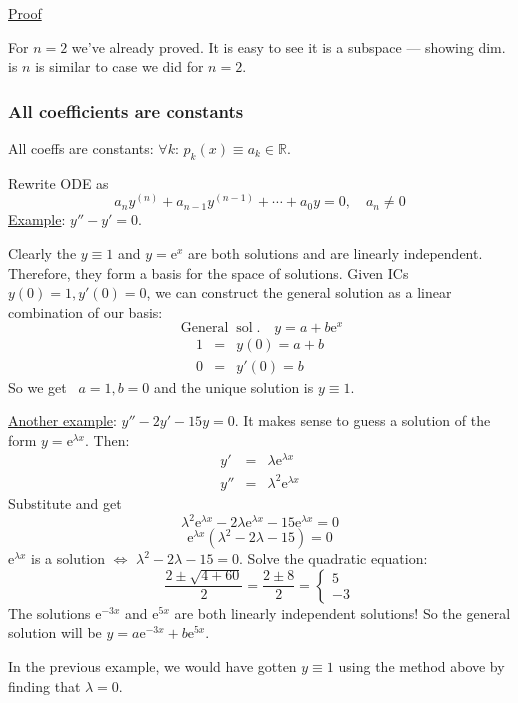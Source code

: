 \documentclass{article}
\newcommand{\mathe}{\mathrm{e}}
\newcommand{\nospace}{}
\newcommand{\nosymbol}{}
\newcommand{\tmop}[1]{\ensuremath{\operatorname{#1}}}
\begin{document}
{\underline{Proof}}

For $n = 2$ we've already proved. It is easy to see it is a subspace ---
showing dim. is $n$ is similar to case we did for $n = 2$.

\subsubsection{All coefficients are constants}

All coeffs are constants: $\forall k$: $p_k^{\nosymbol} (x) \equiv a_k \in
\mathbb{R}$.

Rewrite ODE as
\[ a_n y^{(n)} + a_{n - 1} y^{(n - 1)} + \cdots + a_0 y = 0, \quad a_n \neq 0
\]
{\underline{Example}}: $y'' - y' = 0$.

Clearly the $y \equiv 1$ and $y = \mathe^x$ are both solutions and are
linearly independent. Therefore, they form a basis for the space of solutions.
Given ICs $y (0) = 1, y' (0) = 0$, we can construct the general solution as a
linear combination of our basis:
\[ \tmop{General} \tmop{sol} . \nospace \quad y = a + b \mathe^x \]
\begin{eqnarray*}
  1 & = & y (0) = a + b\\
  0 & = & y' (0) = b
\end{eqnarray*}
So we get \ $a = 1, b = 0$ and the unique solution is $y \equiv 1$.

{\underline{Another example}}: $y'' - 2 y' - 15 y = 0$. It makes sense to
guess a solution of the form $y = \mathe^{\lambda x}$. Then:
\begin{eqnarray*}
  y' & = & \lambda \mathe^{\lambda x}\\
  y'' & = & \lambda^2 \mathe^{\lambda x}
\end{eqnarray*}
Substitute and get
\[ \lambda^2 \mathe^{\lambda x} - 2 \lambda \mathe^{\lambda x} - 15
   \mathe^{\lambda x} = 0 \]
\[ \mathe^{\lambda x}  (\lambda^2 - 2 \lambda - 15) = 0 \]
$\mathe^{\lambda x}$ is a solution $\Longleftrightarrow$ $\lambda^2 - 2
\lambda - 15 = 0$. Solve the quadratic equation:
\[ \frac{2 \pm \sqrt{4 + 60}}{2} = \frac{2 \pm 8}{2} = \left\{\begin{array}{l}
     5\\
     - 3
   \end{array}\right. \]
The solutions $\mathe^{- 3 x}$ and $\mathe^{5 x}$ are both linearly
independent solutions! So the general solution will be $y = a \mathe^{- 3 x} +
b \mathe^{5 x}$.

In the previous example, we would have gotten $y \equiv 1$ using the method
above by finding that $\lambda = 0$.
\end{document}
